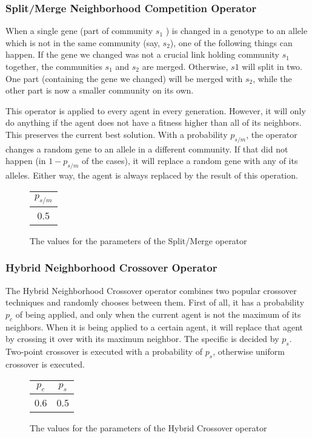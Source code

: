 \subsubsection{Split/Merge Neighborhood Competition Operator}
\label{sec:splitmerge}
When a single gene (part of community $s_1$ ) is changed in a genotype to an allele which is not in the same community (say, $s_2$), one of the following things can happen. If the gene we changed was not a crucial link holding community $s_1$ together, the communities $s_1$ and $s_2$ are merged. Otherwise, $s1$ will split in two. One part (containing the gene we changed) will be merged with $s_2$, while the other part is now a smaller community on its own.
\par
This operator is applied to every agent in every generation. However, it will only do anything if the agent does not have a fitness higher than all of its neighbors. This preserves the current best solution. With a probability $p_{s/m}$, the operator changes a random gene to an allele in a different community. If that did not happen (in $1 - p_{s/m}$ of the cases), it will replace a random gene with any of its alleles. Either way, the agent is always replaced by the result of this operation.
\begin{figure}[H]
\begin{center}
\begin{tabular}{ c }
 $p_{s/m}$\\
 \hline  
  0.5
\end{tabular}
\caption{The values for the parameters of the Split/Merge operator}
\end{center}
\end{figure}  
\subsubsection{Hybrid Neighborhood Crossover Operator}
The Hybrid Neighborhood Crossover operator combines two popular crossover techniques and randomly chooses between them. First of all, it has a probability $p_c$ of being applied, and only when the current agent is not the maximum of its neighbors. When it is being applied to a certain agent, it will replace that agent by crossing it over with its maximum neighbor. The specific is decided by $p_s$. Two-point crossover is executed with a probability of $p_s$, otherwise uniform crossover is executed.
\begin{figure}[H]
\begin{center}
\begin{tabular}{ c c}
 $p_{c}$ & $p_{s}$\\
 \hline  
  0.6 & 0.5
\end{tabular}
\caption{The values for the parameters of the Hybrid Crossover operator}
\end{center}
\end{figure}  
